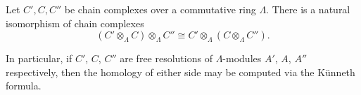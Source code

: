 Let $C', C, C''$ be chain complexes over a commutative ring $\Lambda$. There is a natural isomorphism of chain complexes
$$(C' \otimes_{\Lambda} C) \otimes_{\Lambda} C'' \cong C' \otimes_{\Lambda} (C \otimes_{\Lambda} C'').$$

In particular, if $C'$, $C$, $C''$ are free resolutions of $\Lambda$-modules $A'$, $A$, $A''$ respectively, then the homology of either side may be computed via the Künneth formula.
